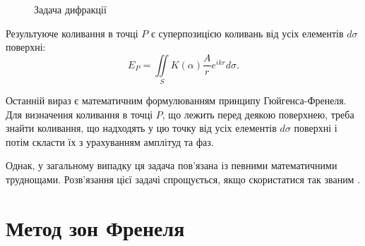 \begin{figure}[h!]
    \centering
    \caption{Задача дифракції}
    \label{pic:Diffraction1}
\end{figure}

Результуюче коливання в точці $ P $ є суперпозицією коливань від усіх елементів $ d\sigma $ поверхні:
\begin{equation}\label{eq:E_p}
    E_P = \iint\limits_{S}K(\alpha) \frac{A}{r} e^{i k r}  d\sigma .
\end{equation}

Останній вираз є математичним формулюванням принципу Гюйгенса-Френеля. Для визначення коливання в точці $ P $, що лежить перед деякою поверхнею, треба знайти коливання, що надходять у цю точку від усіх елементів $ d\sigma $ поверхні і потім скласти їх з урахуванням амплітуд та фаз.

Однак, у загальному випадку ця задача пов'язана із певними математичними труднощами. Розв'язання цієї задачі спрощується, якщо
скористатися так званим .





\section{Метод зон Френеля}




